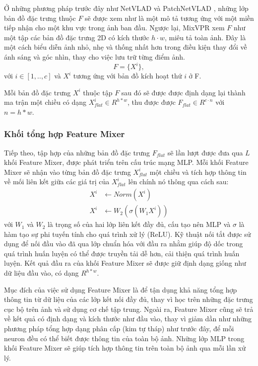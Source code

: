 Ở những phương pháp trước đây như NetVLAD \cite{arandjelovic2016netvlad} và PatchNetVLAD \cite{hausler2021patchnetvlad}, những lớp bản đồ đặc trưng thuộc $F$ sẽ được xem như là một mô tả tương ứng với một miền tiếp nhận cho một khu vực trong ảnh ban đầu. Ngược lại, MixVPR xem $F$ như một tập các bản đồ đặc trưng 2D có kích thước $h \cdot w$, miêu tả toàn ảnh. Đây là một cách biểu diễn ảnh nhỏ, nhẹ và thống nhất hơn trong điều kiện thay đổi về ánh sáng và góc nhìn, thay cho việc lưu trữ từng điểm ảnh.
\begin{equation}
  F = \{X^{i}\},
\end{equation}
với $i \in \left[1,..,c\right]$ và $X^{i}$ tương ứng với bản đồ kích hoạt thứ $i$ ở F.

Mỗi bản đồ đặc trưng $X^{i}$ thuộc tập $F$ sau đó sẽ được được định dạng lại thành ma trận một chiều có dạng $X_{flat}^{i} \in R^{h*w}$, thu được được $F_{flat} \in R^{c \cdot n}$ với $n = h*w$.

\subsubsection{Khối tổng hợp Feature Mixer}
Tiếp theo, tập hợp của những bản đồ đặc trưng $F_{flat}$ sẽ lần lượt được đưa qua $L$ khối Feature Mixer, được phát triển trên cấu trúc mạng MLP. Mỗi khối Feature Mixer sẽ nhận vào từng bản đồ đặc trưng $X_{flat}^{i}$ một chiều và tích hợp thông tin về mối liên kết giữa các giá trị của $X_{flat}^{i}$ lên chính nó thông qua cách sau:
\begin{equation}
  \begin{aligned}
    X^{i} & \leftarrow Norm(X^{i})            \\
    X^{i} & \leftarrow W_2(\sigma(W_1 X^{i}))
  \end{aligned}
\end{equation}
với $W_1$ và $W_2$ là trọng số của hai lớp liên kết đầy đủ, cấu tạo nên MLP và $\sigma$ là hàm tạo sự phi tuyến tính cho quá trình xử lý (ReLU). Kỹ thuật nối tắt được sử dụng để nối đầu vào đã qua lớp chuẩn hóa với đầu ra nhằm giúp độ dốc trong quá trình huấn luyện có thể được truyền tải dễ hơn, cải thiện quá trình huấn luyện. Kết quả đầu ra của khối Feature Mixer sẽ được giữ định dạng giống như dữ liệu đầu vào, có dạng $R^{h*w}$. 

Mục đích của việc sử dụng Feature Mixer là để tận dụng khả năng tổng hợp thông tin từ dữ liệu của các lớp kết nối đầy đủ, thay vì học trên những đặc trưng cục bộ trên ảnh và sử dụng cơ chế tập trung. Ngoài ra, Feature Mixer cũng sẽ trả về kết quả có định dạng và kích thước như đầu vào, thay vì giảm dần như những phương pháp tổng hợp dạng phân cấp (kim tự tháp) như trước đây, để mỗi neuron đều có thể biết được thông tin của toàn bộ ảnh. Những lớp MLP trong khối Feature Mixer sẽ giúp tích hợp thông tin trên toàn bộ ảnh qua mỗi lần xử lý.

